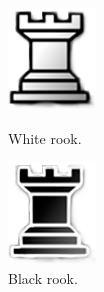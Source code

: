 \documentclass[12pt, a4paper]{article}
\begin{document}
\begin{figure}[h!]
\centering
\begin{minipage}{.5\textwidth}
  \centering
  \includegraphics[width=.4\linewidth]{figures/whitetower.png}
  \caption{White rook.}
\end{minipage}%
\begin{minipage}{.5\textwidth}
  \centering
  \includegraphics[width=.4\linewidth]{figures/blacktower.png}
  \caption{Black rook.}
\end{minipage}
\end{figure}
\end{document}
